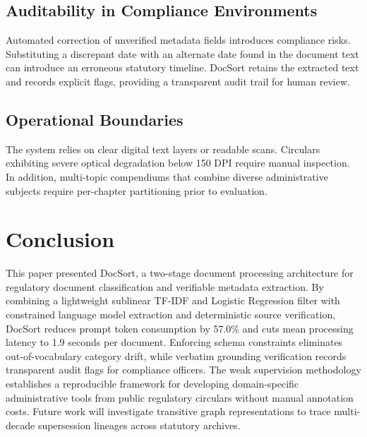 \documentclass[conference]{IEEEtran}
\begin{document}
\subsection{Auditability in Compliance Environments}
Automated correction of unverified metadata fields introduces compliance risks. Substituting a discrepant date with an alternate date found in the document text can introduce an erroneous statutory timeline. DocSort retains the extracted text and records explicit flags, providing a transparent audit trail for human review.

\subsection{Operational Boundaries}
The system relies on clear digital text layers or readable scans. Circulars exhibiting severe optical degradation below 150 DPI require manual inspection. In addition, multi-topic compendiums that combine diverse administrative subjects require per-chapter partitioning prior to evaluation.

\section{Conclusion}

This paper presented DocSort, a two-stage document processing architecture for regulatory document classification and verifiable metadata extraction. By combining a lightweight sublinear TF-IDF and Logistic Regression filter with constrained language model extraction and deterministic source verification, DocSort reduces prompt token consumption by 57.0\% and cuts mean processing latency to 1.9 seconds per document. Enforcing schema constraints eliminates out-of-vocabulary category drift, while verbatim grounding verification records transparent audit flags for compliance officers. The weak supervision methodology establishes a reproducible framework for developing domain-specific administrative tools from public regulatory circulars without manual annotation costs. Future work will investigate transitive graph representations to trace multi-decade supersession lineages across statutory archives.



\end{document}
